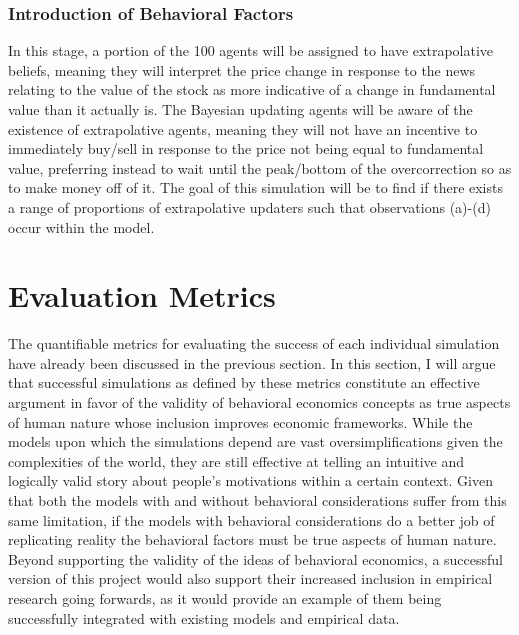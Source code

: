 \documentclass[10pt,twocolumn]{article}
\begin{document}
\subsubsection{Introduction of Behavioral Factors}
In this stage, a portion of the 100 agents will be assigned to have extrapolative beliefs, meaning they will interpret the price change in response to the news relating to the value of the stock as more indicative of a change in fundamental value than it actually is. The Bayesian updating agents will be aware of the existence of extrapolative agents, meaning they will not have an incentive to immediately buy/sell in response to the price not being equal to fundamental value, preferring instead to wait until the peak/bottom of the overcorrection so as to make money off of it. The goal of this simulation will be to find if there exists a range of proportions of extrapolative updaters such that observations (a)-(d) occur within the model.

\section{Evaluation Metrics}
The quantifiable metrics for evaluating the success of each individual simulation have already been discussed in the previous section. In this section, I will argue that successful simulations as defined by these metrics constitute an effective argument in favor of the validity of behavioral economics concepts as true aspects of human nature whose inclusion improves economic frameworks. While the models upon which the simulations depend are vast oversimplifications given the complexities of the world, they are still effective at telling an intuitive and logically valid story about people’s motivations within a certain context. Given that both the models with and without behavioral considerations suffer from this same limitation, if the models with behavioral considerations do a better job of replicating reality the behavioral factors must be true aspects of human nature. Beyond supporting the validity of the ideas of behavioral economics, a successful version of this project would also support their increased inclusion in empirical research going forwards, as it would provide an example of them being successfully integrated with existing models and empirical data.
\end{document}
